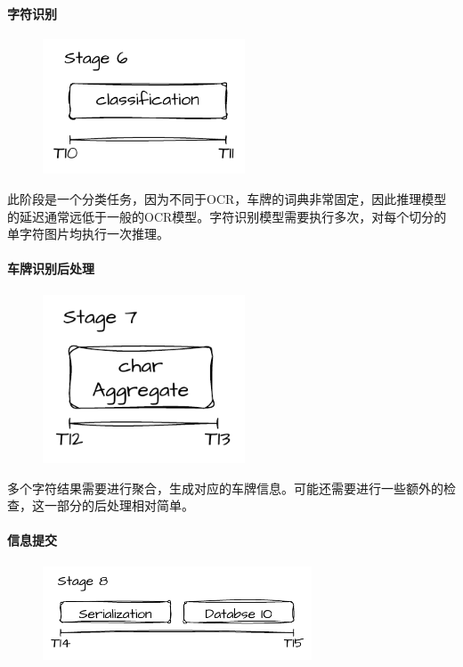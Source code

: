 \documentclass[master]{shtthesis}
\begin{document}
\paragraph{字符识别}

\begin{figure}[H]
	\centering
	\includegraphics[width=6cm]{img/s6.pdf}
	\label{字符识别阶段}
\end{figure}

此阶段是一个分类任务，因为不同于OCR，车牌的词典非常固定，因此推理模型的延迟通常远低于一般的OCR模型。字符识别模型需要执行多次，对每个切分的单字符图片均执行一次推理。


\paragraph{车牌识别后处理}
\begin{figure}[H]
	\centering
	\includegraphics[width=6cm]{img/s7.pdf}
	\label{车牌识别后处理阶段}
\end{figure}

多个字符结果需要进行聚合，生成对应的车牌信息。可能还需要进行一些额外的检查，这一部分的后处理相对简单。

\paragraph{信息提交}

\begin{figure}[H]
	\centering
	\includegraphics[width=8cm]{img/s8.pdf}
	\label{信息提交阶段}
\end{figure}
\end{document}
